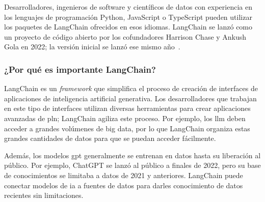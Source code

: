 Desarrolladores, ingenieros de software y científicos de datos con experiencia en los lenguajes de programación Python, JavaScript o TypeScript pueden utilizar los paquetes de LangChain ofrecidos en esos idiomas. LangChain se lanzó como un proyecto de código abierto por los cofundadores Harrison Chase y Ankush Gola en 2022; la versión inicial se lanzó ese mismo año~\cite{Langchain}.

\subsubsection{¿Por qué es importante LangChain?}
LangChain es un \textit{framework} que simplifica el proceso de creación de interfaces de aplicaciones de inteligencia artificial generativa. Los desarrolladores que trabajan en este tipo de interfaces utilizan diversas herramientas para crear aplicaciones avanzadas de \acrshort{pln}; LangChain agiliza este proceso. Por ejemplo, los \acrshort{llm} deben acceder a grandes volúmenes de big data, por lo que LangChain organiza estas grandes cantidades de datos para que se puedan acceder fácilmente.

Además, los modelos \acrfull{gpt} generalmente se entrenan en datos hasta su liberación al público. Por ejemplo, ChatGPT se lanzó al público a finales de 2022, pero su base de conocimientos se limitaba a datos de 2021 y anteriores. LangChain puede conectar modelos de \acrshort{ia} a fuentes de datos para darles conocimiento de datos recientes sin limitaciones.

